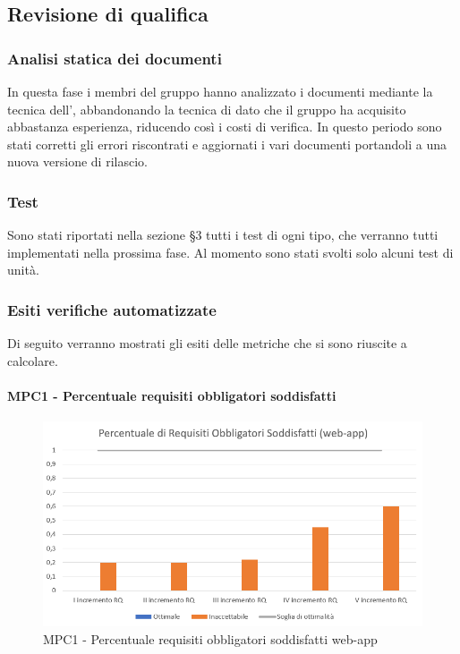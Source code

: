 \subsection{Revisione di qualifica}
\subsubsection{Analisi statica dei documenti}
In questa fase i membri del gruppo \Gruppo{} hanno analizzato i documenti mediante la tecnica dell', abbandonando la tecnica di  dato che il gruppo ha acquisito abbastanza esperienza, riducendo così i costi di verifica. In questo periodo sono stati corretti gli errori riscontrati e aggiornati i vari documenti portandoli a una nuova versione di rilascio.
\subsubsection{Test}
Sono stati riportati nella sezione §3 tutti i test di ogni tipo, che verranno tutti implementati nella prossima fase. Al momento sono stati svolti solo alcuni test di unità.
\subsubsection{Esiti verifiche automatizzate}
Di seguito verranno mostrati gli esiti delle metriche che si sono riuscite a calcolare.

\paragraph{MPC1 - Percentuale requisiti obbligatori soddisfatti}
\begin{figure}[h!]
    \centering
      \includegraphics[scale=1]{Immagini/PercReqObbWA.PNG}
    \caption{MPC1 - Percentuale requisiti obbligatori soddisfatti web-app}
  \end{figure}

